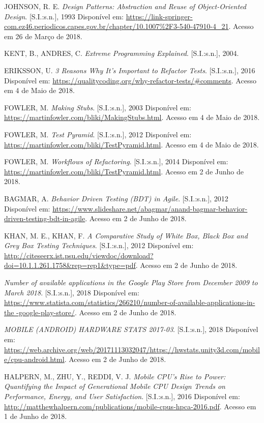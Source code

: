 \documentclass[
    12pt,       %
    openright,      %
    twoside,      %
    a4paper,      %
    english,      %
    french,       %
    spanish,      %
    brazil,       %
    ]{abntex2}
\begin{document}
  \noindent
  JOHNSON, R. E. \textit{Design Patterns: Abstraction and Reuse of Object-Oriented Design}. [S.I.:s.n.], 1993 Disponível em: \url{https://link-springer-com.ez46.periodicos.capes.gov.br/chapter/10.1007%2F3-540-47910-4_21}. Acesso em 26 de Março de 2018.

  \noindent
  KENT, B., ANDRES, C. \textit{Extreme Programming Explained}. [S.I.:s.n.], 2004.

  \noindent
  ERIKSSON, U. \textit{3 Reasons Why It's Important to Refactor Tests}. [S.I.:s.n.], 2016 Disponível em:
  \url{https://qualitycoding.org/why-refactor-tests/#comments}. Acesso em 4 de Maio de 2018.

  \noindent
  FOWLER, M. \textit{Making Stubs}. [S.I.:s.n.], 2003 Disponível em:
  \url{https://martinfowler.com/bliki/MakingStubs.html}. Acesso em 4 de Maio de 2018.

  \noindent
  FOWLER, M. \textit{Test Pyramid}. [S.I.:s.n.], 2012 Disponível em:
  \url{https://martinfowler.com/bliki/TestPyramid.html}. Acesso em 4 de Maio de 2018.

  \noindent
  FOWLER, M. \textit{Workflows of Refactoring}. [S.I.:s.n.], 2014 Disponível em:
  \url{https://martinfowler.com/bliki/TestPyramid.html}. Acesso em 2 de Junho de 2018.

  \noindent
  BAGMAR, A. \textit{Behavior Driven Testing (BDT) in Agile}. [S.I.:s.n.], 2012 Disponível em:
  \url{https://www.slideshare.net/abagmar/anand-bagmar-behavior-driven-testing-bdt-in-agile}. Acesso em 2 de Junho de 2018.

  \noindent
  KHAN, M. E., KHAN, F. \textit{A Comparative Study of White Box, Black Box and Grey Box Testing Techniques}. [S.I.:s.n.], 2012 Disponível em: \url{http://citeseerx.ist.psu.edu/viewdoc/download?doi=10.1.1.261.1758&rep=rep1&type=pdf}. Acesso em 2 de Junho de 2018.

  \noindent
  \textit{Number of available applications in the Google Play Store from December 2009 to March 2018}.
  [S.I.:s.n.], 2018 Disponível em: \url{https://www.statista.com/statistics/266210/number-of-available-applications-in-the -google-play-store/}. Acesso em 2 de Junho de 2018.

  \noindent
  \textit{MOBILE (ANDROID) HARDWARE STATS 2017-03}. [S.I.:s.n.], 2018 Disponível em: \url{https://web.archive.org/web/20171113032047/https://hwstats.unity3d.com/mobile/cpu-android.html}. Acesso em 2 de Junho de 2018.

  \noindent
  HALPERN, M., ZHU, Y., REDDI, V. J. \textit{Mobile CPU’s Rise to Power: Quantifying the Impact of Generational Mobile CPU Design Trends on Performance, Energy, and User Satisfaction}.
  [S.I.:s.n.], 2016 Disponível em: \url{http://matthewhalpern.com/publications/mobile-cpus-hpca-2016.pdf}. Acesso em 1 de Junho de 2018.
\end{document}
